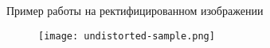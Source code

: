 \begin{frame}{Пример работы на ректифицированном изображении}
\begin{figure}
    \centering
    \texttt{[image: undistorted-sample.png]}
\end{figure}
\end{frame}